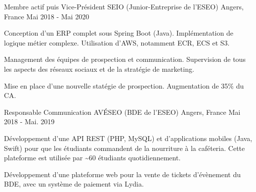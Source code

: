 

\begin{cventries}

  \cventry
    {Membre actif puis Vice-Président} %
    {SEIO (Junior-Entreprise de l'ESEO)} %
    {Angers, France} %
    {Mai 2018 - Mai 2020} %
    {
      \begin{cvitems} %
        \item {Conception d'un ERP complet sous Spring Boot (Java). Implémentation de logique métier complexe. Utilisation d'AWS, notamment ECR, ECS et S3.}
        \item {Management des équipes de prospection et communication. Supervision de tous les aspects des réseaux sociaux et de la stratégie de marketing.}
        \item {Mise en place d'une nouvelle statégie de prospection. Augmentation de 35\% du CA.}
      \end{cvitems}
    }

  \cventry
    {Responsable Communication} %
    {AVÉSEO (BDE de l'ESEO)} %
    {Angers, France} %
    {Mai 2018 - Mai. 2019} %
    {
      \begin{cvitems} %
        \item {Développement d'une API REST (PHP, MySQL) et d'applications mobiles (Java, Swift) pour que les étudiants commandent de la nourriture à la caféteria. Cette plateforme est utilisée par \textasciitilde60 étudiants quotidiennement.}
        \item {Développement d'une plateforme web pour la vente de tickets d'évènement du BDE, avec un système de paiement via Lydia.}
      \end{cvitems}
    }

\end{cventries}
